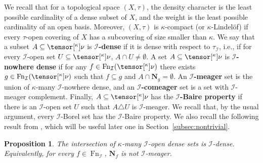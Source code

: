 \documentclass{amsart}
\numberwithin{equation}{section}
\newcommand{\I}{\mathcal{I}}
\newcommand{\pre}[2]{\tensor[^{#1}]{#2}{}}
\newcommand{\Nbhd}{\boldsymbol{N}}
\newcommand{\markdef}[1]{\textbf{#1}}
\newcommand{\1}{\mathbf{I}}
\newcommand{\2}{\mathbf{II}}
\renewcommand{\k}{\kappa}
\DeclareMathOperator{\Fn}{Fn}
\newcommand{\clopen}[1]{\Nbhd_{#1}}
\newtheorem{proposition}[theorem]{Proposition}
\theoremstyle{definition}
\theoremstyle{remark}
\begin{document}
\medskip
We recall that for a topological space $(X,\tau)$, the density character is the least possible cardinality of a dense subset of $X$, and the weight is the least possible cardinality of an open basis. Moreover,  $(X,\tau)$ is \(\k\)-compact (or \(\k\)-Lindel\"of) if every \(\tau\)-open covering of $X$ has a subcovering of size smaller than \(\k\).  We say that a subset \(A \subseteq \pre{\k}{\nu}\) is \markdef{\(\I\)-dense} if it is dense with respect to \(\tau_\I\), i.e., if for every \(\I\)-open set \(U \subseteq \pre{\k}{\nu}\), \(A \cap U \neq \emptyset\).  A set \(A \subseteq \pre{\k}{\nu}\) is \markdef{\(\I\)-nowhere dense} if for any \(f \in \Fn_\I(\pre{\k}{\nu})\) there exists \(g \in \Fn_\I(\pre{\k}{\nu})\) such that \(f \subseteq g\) and \(A \cap \clopen{g}=\emptyset\). An \markdef{\(\I\)-meager} set is the union of \(\k\)-many \(\I\)-nowhere dense, and an \markdef{\(\I\)-comeager} set is a set with \(\I\)-meager complement.  Finally, \(A \subseteq \pre{\k}{\nu}\) has the \markdef{\(\I\)-Baire property} if there is an \(\I\)-open set $U$ such that $A \triangle U$ is \(\I\)-meager. We recall that, by the usual argument, every \(\I\)-Borel set has the \(\I\)-Baire property.
We also recall the following result from \cite{HKSW22}, which will be useful later one in Section~\ref{subsec:nontrivial}.
\begin{proposition}\cite[Proposition 1.3]{HKSW22} \label{1.3}The intersection of
\(\k\)-many $\I$-open dense sets is $\I$-dense. Equivalently, for every \(f \in \Fn_\I\), \(\clopen{f}\) is not $\I$-meager. 
\end{proposition}
\end{document}
